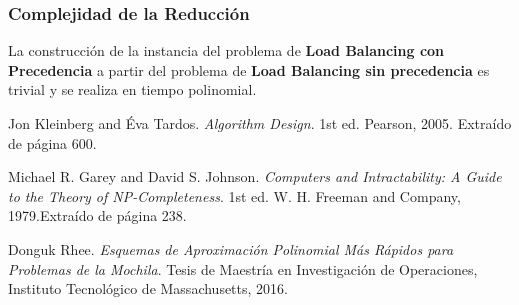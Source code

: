 \documentclass{report}
\begin{document}
	\subsubsection*{Complejidad de la Reducción}
	
	La construcción de la instancia del problema de \textbf{Load Balancing con Precedencia} a partir del problema de \textbf{Load Balancing sin precedencia} es trivial y se realiza en tiempo polinomial.
	
	
	
	
	\begin{thebibliography}{9}
		Jon Kleinberg and Éva Tardos.
		\textit{Algorithm Design}.
		1st ed. Pearson, 2005. Extraído de página 600.

		Michael R. Garey and David S. Johnson.
		\textit{Computers and Intractability: A Guide to the Theory of NP-Completeness}.
		1st ed. W. H. Freeman and Company, 1979.Extraído de página 238.
		
		Donguk Rhee.
		\textit{Esquemas de Aproximación Polinomial Más Rápidos para Problemas de la Mochila}.
		Tesis de Maestría en Investigación de Operaciones, Instituto Tecnológico de Massachusetts, 2016.
		
	\end{thebibliography}
\end{document}
